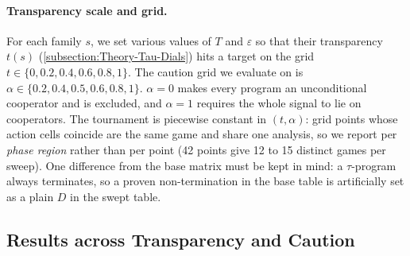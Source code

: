 \paragraph{Transparency scale and grid.} For each family $s$, we set various values of $T$ and $\varepsilon$ so that their transparency $t(s)$ (\cref{subsection:Theory-Tau-Dials}) hits a target on the grid $t \in \{0, 0.2, 0.4, 0.6, 0.8, 1\}$. The caution grid we evaluate on is $\alpha \in \{0.2, 0.4, 0.5, 0.6, 0.8, 1\}$. $\alpha = 0$ makes every program an unconditional cooperator and is excluded, and $\alpha = 1$ requires the whole signal to lie on cooperators. The tournament is piecewise constant in $(t,\alpha)$: grid points whose action cells coincide are the same game and share one analysis, so we report per \emph{phase region} rather than per point (42 points give 12 to 15 distinct games per sweep). One difference from the base matrix must be kept in mind: a $\tau$-program always terminates, so a proven non-termination in the base table is artificially set as a plain $D$ in the swept table.

\subsection{Results across Transparency and Caution}
\label{subsection:Results-Transparency-Analysis}
